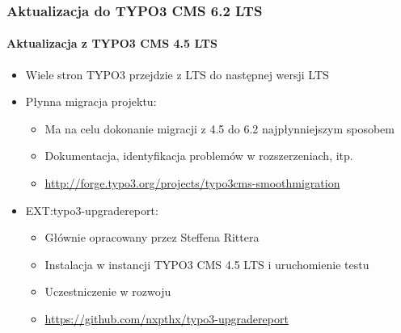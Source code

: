 
\begin{frame}[fragile]
	\frametitle{Aktualizacja do TYPO3 CMS 6.2 LTS}
	\framesubtitle{Aktualizacja z TYPO3 CMS 4.5 LTS}

	\begin{itemize}
		\item Wiele stron TYPO3 przejdzie z LTS do następnej wersji LTS
		\item Płynna migracja projektu:

			\begin{itemize}
				\item Ma na celu dokonanie migracji z 4.5 do 6.2 najpłynniejszym sposobem
				\item Dokumentacja, identyfikacja problemów w rozszerzeniach, itp.
				\item \smaller\url{http://forge.typo3.org/projects/typo3cms-smoothmigration}\normalsize
			\end{itemize}

		\item EXT:typo3-upgradereport:

			\begin{itemize}
				\item Głównie opracowany przez Steffena Rittera
				\item Instalacja w instancji TYPO3 CMS 4.5 LTS i uruchomienie testu
				\item Uczestniczenie w rozwoju
				\item \smaller\url{https://github.com/nxpthx/typo3-upgradereport}\normalsize
			\end{itemize}
	\end{itemize}

\end{frame}


